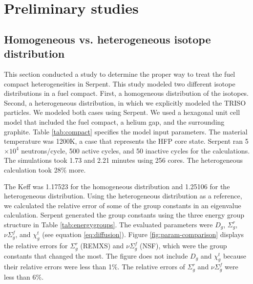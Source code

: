 \documentclass[11pt,letterpaper]{article}
\begin{document}
\section{Preliminary studies}

\subsection{Homogeneous vs. heterogeneous isotope distribution}

This section conducted a study to determine the proper way to treat the fuel compact heterogeneities in Serpent.
This study modeled two different isotope distributions in a fuel compact.
First, a homogeneous distribution of the isotopes.
Second, a heterogeneous distribution, in which we explicitly modeled the TRISO particles.
We modeled both cases using Serpent.
We used a hexagonal unit cell model that included the fuel compact, a helium gap, and the surrounding graphite.
Table \ref{tab:compact} specifies the model input parameters.
The material temperature was 1200K, a case that represents the \gls{HFP} core state.
Serpent ran 5$\times 10^4$ neutrons/cycle, 500 active cycles, and 50 inactive cycles for the calculations.
The simulations took 1.73 and 2.21 minutes using 256 cores.
The heterogeneous calculation took 28$\%$ more.

The \gls{Keff} was 1.17523 for the homogeneous distribution and 1.25106 for the heterogeneous distribution.
Using the heterogeneous distribution as a reference, we calculated the relative error of some of the group constants in an eigenvalue calculation.
Serpent generated the group constants using the three energy group structure in Table \ref{tab:energygroups}.
The evaluated parameters were $D_g$, $\Sigma^r_g$, $\nu\Sigma^f_g$, and $\chi^t_g$ (see equation \ref{eq:diffusion}).
Figure \ref{fig:param-comparison} displays the relative errors for $\Sigma^r_g$ (REMXS) and $\nu\Sigma^f_g$ (NSF), which were the group constants that changed the most.
The figure does not include $D_g$ and $\chi^t_g$ because their relative errors were less than 1$\%$.
The relative errors of $\Sigma^r_g$ and $\nu\Sigma^f_g$ were less than 6$\%$.

\end{document}
